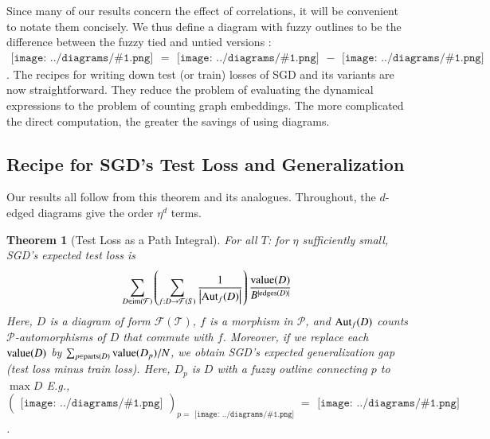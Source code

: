 \documentclass{article}
\newtheorem{thm}{Theorem}
\newcommand{\Free}{\mathcal{F}}
\newcommand{\Aut}{\text{\textnormal{Aut}}}
\newcommand{\image}{\text{\textnormal{im}}}
\newcommand{\dvalue}{\text{\textnormal{value}}}
\newcommand{\edges}{\text{\textnormal{edges}}}
\newcommand{\parts}{\text{\textnormal{parts}}}
\newcommand{\Pp}{\mathcal{P}}
\newcommand{\Tt}{\mathcal{T}}
\newcommand{\wrap}[1]{\left(#1\right)}
\newcommand{\wabs}[1]{\left|#1\right|}
\newcommand{\sdia}[1]{\begin{gathered}\texttt{[image: ../diagrams/\#1.png]}\end{gathered}}
\begin{document}
        Since many of our results concern the effect of correlations, it will
        be convenient to notate them concisely.  We thus define a diagram with
        fuzzy outlines to be the difference between the fuzzy tied and untied
        versions : $\sdia{c(01-2)(01-12)} =
        \sdia{(01-2)(01-12)}-\sdia{(0-1-2)(01-12)}$.  
        The recipes for writing down test (or train) losses of SGD and its
        variants are now straightforward.  They reduce the problem of
        evaluating the dynamical expressions to the problem of
        counting graph embeddings.  The more complicated the direct
        computation, the greater the savings of using diagrams.  
    

    \subsection{Recipe for SGD's Test Loss and Generalization}

        Our results all follow from this theorem and its analogues.
        Throughout, the $d$-edged diagrams give the order $\eta^d$ terms.
        \begin{thm}[Test Loss as a Path Integral] \label{thm:sgdcoef}
            For all $T$: for $\eta$ sufficiently small, SGD's expected test
            loss is
            \begin{equation}\label{eq:sgdcoef}
                \sum_{D \in \image(\Free)} \wrap{
                    \sum_{f: D\to\Free(S)}
                    \frac{1}{\wabs{\Aut_f(D)}}
                }
                \frac{\dvalue(D)}{B^{|\edges(D)|}}
            \end{equation}
            Here, $D$ is a diagram of form $\Free(\Tt)$,
            $f$ is a morphism in $\Pp$, and $\Aut_f(D)$ counts
            $\Pp$-automorphisms of $D$ that commute with $f$. 
            Moreover, if we replace each $\dvalue(D)$ by
            $
                \sum_{p \in \parts(D)} \dvalue(D_p)/N
            $, we obtain
            SGD's expected generalization gap (test loss minus train loss).
            Here, $D_p$ is $D$ with a fuzzy outline connecting $p$ to $\max D$
            E.g., $(\sdia{(0-1)(01)})_{p=\sdia{(0)()}} =
            \sdia{c(01)(01)}$.
        \end{thm}
    
\end{document}
